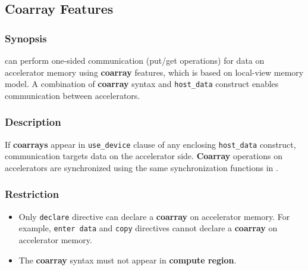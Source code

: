 \subsection{Coarray Features} \label{sec:coarray}
\subsubsection*{Synopsis}
{\XACC} can perform one-sided communication (put/get operations) for data on accelerator memory using {\bf coarray} features,
which is based on {\XMP} local-view memory model.
A combination of {\bf coarray} syntax and {\tt host\_data} construct enables communication between accelerators.

\subsubsection*{Description}
If {\bf coarrays} appear in {\tt use\_device} clause of any enclosing {\tt host\_data} construct, 
communication targets data on the accelerator side. 
{\bf Coarray} operations on accelerators are synchronized using the same synchronization functions in {\XMP}.

\subsubsection*{Restriction}
\begin{itemize}
 \item Only {\tt declare} directive can declare a {\bf coarray} on accelerator memory.
   For example,
   {\tt enter data} and {\tt copy} directives cannot declare a {\bf coarray} on accelerator memory.
 \item The {\bf coarray} syntax must not appear in {\OACC} {\bf compute region}.
\end{itemize}


